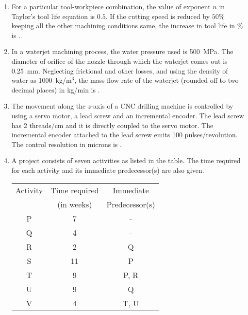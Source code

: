 \documentclass[journal,12pt,onecolumn]{IEEEtran}
\theoremstyle{remark}
\begin{document}
\begin{enumerate}
\item For a particular tool-workpiece combination, the value of exponent $n$ in Taylor's tool life equation is $0.5$. If the cutting speed is reduced by $50\%$ keeping all the other machining conditions same, the increase in tool life in \% is \underline{\hspace{2cm}}.
\vspace{1cm}

\item In a waterjet machining process, the water pressure used is 500~MPa. The diameter of orifice of the nozzle through which the waterjet comes out is 0.25~mm. Neglecting frictional and other losses, and using the density of water as 1000~kg/m$^3$, the mass flow rate of the waterjet (rounded off to two decimal places) in kg/min is \underline{\hspace{2cm}}.
\vspace{1cm}

\item The movement along the $z$-axis of a CNC drilling machine is controlled by using a servo motor, a lead screw and an incremental encoder. The lead screw has 2 threads/cm and it is directly coupled to the servo motor. The incremental encoder attached to the lead screw emits 100 pulses/revolution. The control resolution in microns is \underline{\hspace{2cm}}.
\vspace{1cm}

\item A project consists of seven activities as listed in the table. The time required for each activity and its immediate predecessor(s) are also given.

\begin{center}
\begin{tabular}{|c|c|c|}
\hline
Activity & Time required & Immediate \\
         & (in weeks)    & Predecessor(s) \\
\hline
P & 7 & - \\
Q & 4 & - \\
R & 2 & Q \\
S & 11 & P \\
T & 9 & P, R \\
U & 9 & Q \\
V & 4 & T, U \\
\hline
\end{tabular}
\end{center}


\end{enumerate}
\end{document}
